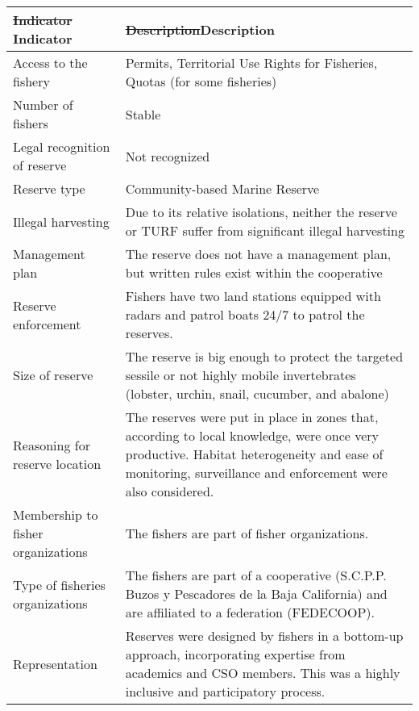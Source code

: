 \documentclass[12pt,]{article}
\providecommand{\DIFdeltex}[1]{{\protect\color{red}\sout{#1}}}                      %
\providecommand{\DIFdelFL}[1]{\DIFdel{#1}} %
\providecommand{\DIFaddbeginFL}{} %
\providecommand{\DIFaddendFL}{} %
\providecommand{\DIFdelbeginFL}{} %
\providecommand{\DIFdelendFL}{} %
\providecommand{\DIFdel}[1]{\texorpdfstring{\DIFdeltex{#1}}{}} %
\newcommand{\DIFscaledelfig}{0.5}
\newlength{\DIFdelgraphicswidth} %
\newlength{\DIFdelgraphicsheight} %
\newcommand{\DIFaddincludegraphics}[2][]{{\color{blue}\fbox{\DIFOincludegraphics[#1]{#2}}}} %
\newcommand{\DIFdelincludegraphics}[2][]{%
\sbox{\DIFdelgraphicsbox}{\DIFOincludegraphics[#1]{#2}}%
\settoboxwidth{\DIFdelgraphicswidth}{\DIFdelgraphicsbox} %
\settoboxtotalheight{\DIFdelgraphicsheight}{\DIFdelgraphicsbox} %
\scalebox{\DIFscaledelfig}{%
\parbox[b]{\DIFdelgraphicswidth}{\usebox{\DIFdelgraphicsbox}\\[-\baselineskip] \rule{\DIFdelgraphicswidth}{0em}}\llap{\resizebox{\DIFdelgraphicswidth}{\DIFdelgraphicsheight}{%
\setlength{\unitlength}{\DIFdelgraphicswidth}%
\begin{picture}(1,1)%
\thicklines\linethickness{2pt} %
{\color[rgb]{1,0,0}\put(0,0){\framebox(1,1){}}}%
{\color[rgb]{1,0,0}\put(0,0){\line( 1,1){1}}}%
{\color[rgb]{1,0,0}\put(0,1){\line(1,-1){1}}}%
\end{picture}%
}\hspace*{3pt}}} %
} %
\DeclareRobustCommand{\DIFaddbeginFL}{\DIFOaddbeginFL \let\includegraphics\DIFaddincludegraphics} %
\DeclareRobustCommand{\DIFaddendFL}{\DIFOaddendFL \let\includegraphics\DIFOincludegraphics} %
\DeclareRobustCommand{\DIFdelbeginFL}{\DIFOdelbeginFL \let\includegraphics\DIFdelincludegraphics} %
\DeclareRobustCommand{\DIFdelendFL}{\DIFOaddendFL \let\includegraphics\DIFOincludegraphics} %
\begin{document}
\begin{table}[H]
\DIFaddendFL \centering
\DIFdelbeginFL %
\DIFdelendFL \DIFaddbeginFL \begin{tabular}{l|>{\raggedright\arraybackslash}p{9cm}}
\DIFaddendFL \hline
\DIFdelbeginFL \DIFdelFL{Indicator }\DIFdelendFL \DIFaddbeginFL \bfseries{Indicator} \DIFaddendFL & \DIFdelbeginFL \DIFdelFL{Description}\DIFdelendFL \DIFaddbeginFL \bfseries{Description}\DIFaddendFL \\
\hline
Access to the fishery & Permits, Territorial Use Rights for Fisheries, Quotas (for some fisheries)\\
\hline
Number of fishers & Stable\\
\hline
Legal recognition of reserve & Not recognized\\
\hline
Reserve type & Community-based Marine Reserve\\
\hline
Illegal harvesting & Due to its relative isolations, neither the reserve or TURF suffer from significant illegal harvesting\\
\hline
Management plan & The reserve does not have a management plan, but written rules exist within the cooperative\\
\hline
Reserve enforcement & Fishers have two land stations equipped with radars and patrol boats 24/7 to patrol the reserves.\\
\hline
Size of reserve & The reserve is big enough to protect the targeted sessile or not highly mobile invertebrates (lobster, urchin, snail, cucumber, and abalone)\\
\hline
Reasoning for reserve location & The reserves were put in place in zones that, according to local knowledge, were once very productive. Habitat heterogeneity and ease of monitoring, surveillance and enforcement were also considered.\\
\hline
Membership to fisher organizations & The fishers are part of fisher organizations.\\
\hline
Type of fisheries organizations & The fishers are part of a cooperative (S.C.P.P. Buzos y Pescadores de la Baja California) and are affiliated to a federation (FEDECOOP).\\
\hline
Representation & Reserves were designed by fishers in a bottom-up approach, incorporating expertise from academics and CSO members. This was a highly inclusive and participatory process.\\

\end{tabular}
\end{table}
\end{document}
